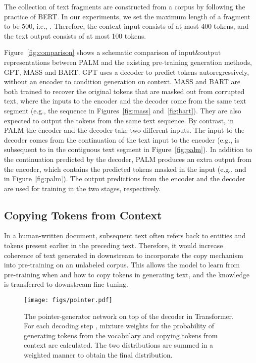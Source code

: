 \documentclass[11pt,a4paper]{article}
\newcommand{\method}{PALM\xspace}
\begin{document}
The collection of text fragments are constructed from a corpus by following the practice of BERT. In our experiments, we set the maximum length of a fragment to be 500, i.e., . Therefore, the context input consists of at most 400 tokens, and the text output consists of at most 100 tokens.

Figure~\ref{fig:comparison} shows a schematic comparison of input\&output representations between \method and the existing pre-training generation methods, GPT, MASS and BART. GPT uses a decoder to predict tokens autoregressively, without an encoder to condition generation on context. MASS and BART are both trained to recover the original tokens that are masked out from corrupted text, where the inputs to the encoder and the decoder come from the same text segment (e.g., the sequence  in Figures~\ref{fig:mass} and~\ref{fig:bart}). They are also expected to output the tokens from the same text sequence. By contrast, in \method the encoder and the decoder take two different inputs. The input to the decoder comes from the continuation of the text input to the encoder (e.g.,  is subsequent to  in the contiguous text segment  in Figure~\ref{fig:palm}). In addition to the continuation predicted by the decoder, \method produces an extra output from the encoder, which contains the predicted tokens masked in the input (e.g.,  and  in Figure~\ref{fig:palm}). The output predictions from the encoder and the decoder are used for training in the two stages, respectively.

\subsection{Copying Tokens from Context}
In a human-written document, subsequent text often refers back to entities and tokens present earlier in the preceding text. Therefore, it would increase coherence of text generated in downstream to incorporate the copy mechanism into pre-training on an unlabeled corpus. This allows the model to learn from pre-training when and how to copy tokens in generating text, and the knowledge is transferred to downstream fine-tuning.

\begin{figure}[t]
    \centering
    \texttt{[image: figs/pointer.pdf]}
    \caption{The pointer-generator network on top of the decoder in Transformer. For each decoding step , mixture weights  for the probability of generating tokens from the vocabulary and copying tokens from context are calculated. The two distributions are summed in a weighted manner to obtain the final distribution.}
    \label{fig:pointer}
\end{figure}
\end{document}
